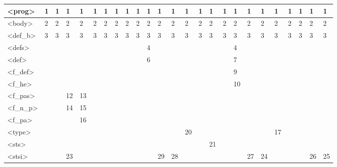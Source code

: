 \begin{normalsize}
\begin{enumerate}
\begin{footnotesize}
\begin{table}[htbp]
\begin{tabular}{|l|l|l|l|l|l|l|l|l|l|l|l|l|l|l|l|l|l|l|l|l|l|l|l|l|}
<prog>&1&1&1&1&1&1&1&1&1&1&1&1&1&1&1&1&1&1&1&1&1&1&1&1
\\ \hline
<body>&2&2&2&2&2&2&2&2&2&2&2&2&2&2&2&2&2&2&2&2&2&2&2&2
\\ \hline
<def\_b>&3&3&3&3&3&3&3&3&3&3&3&3&3&3&3&3&3&3&3&3&3&3&3&3
\\ \hline
<defs>&&&&&&&&&&4&&&&&&&4&&&&&&&
\\ \hline
<def>&&&&&&&&&&6&&&&&&&7&&&&&&&
\\ \hline
<f\_def>&&&&&&&&&&&&&&&&&9&&&&&&&
\\ \hline
<f\_he>&&&&&&&&&&&&&&&&&10&&&&&&&
\\ \hline
<f\_pas>&&&12&13&&&&&&&&&&&&&&&&&&&&
\\ \hline
<f\_n\_p>&&&14&15&&&&&&&&&&&&&&&&&&&&
\\ \hline
<f\_pa>&&&&16&&&&&&&&&&&&&&&&&&&&
\\ \hline
<type>&&&&&&&&&&&&&20&&&&&&&17&&&&
\\ \hline
<sts>&&&&&&&&&&&&&&&21&&&&&&&&&
\\ \hline
<stsi>&&&23&&&&&&&&29&28&&&&&&27&24&&&&26&25
\\ \hline
\end{tabular}
\vspace{22px}

\begin{tabular}{|l|l|l|l|l|l|l|l|l|l|l|l|l|l|l|l|l|l|l|l|l|l|l|l|l|}
\hline



\end{tabular}
\end{table}
\end{footnotesize}
\end{enumerate}
\end{normalsize}
